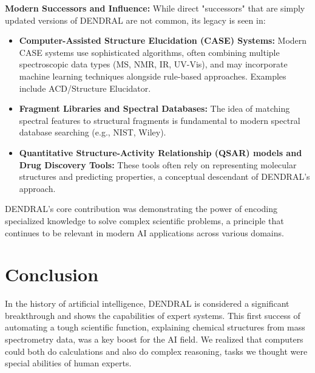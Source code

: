 \documentclass[12pt,a4paper]{article}
\begin{document}
\textbf{Modern Successors and Influence:}
While direct "successors" that are simply updated versions of DENDRAL are not common, its legacy is seen in:
\begin{itemize}
    \item \textbf{Computer-Assisted Structure Elucidation (CASE) Systems:} Modern CASE systems use sophisticated algorithms, often combining multiple spectroscopic data types (MS, NMR, IR, UV-Vis), and may incorporate machine learning techniques alongside rule-based approaches. Examples include ACD/Structure Elucidator.
    \item \textbf{Fragment Libraries and Spectral Databases:} The idea of matching spectral features to structural fragments is fundamental to modern spectral database searching (e.g., NIST, Wiley).
    \item \textbf{Quantitative Structure-Activity Relationship (QSAR) models and Drug Discovery Tools:} These tools often rely on representing molecular structures and predicting properties, a conceptual descendant of DENDRAL's approach.
\end{itemize}
DENDRAL's core contribution was demonstrating the power of encoding specialized knowledge to solve complex scientific problems, a principle that continues to be relevant in modern AI applications across various domains.

\section{Conclusion}
In the history of artificial intelligence, DENDRAL is considered a significant breakthrough and shows the capabilities of expert systems. This first success of automating a tough scientific function, explaining chemical structures from mass spectrometry data, was a key boost for the AI field. We realized that computers could both do calculations and also do complex reasoning, tasks we thought were special abilities of human experts.
\end{document}
